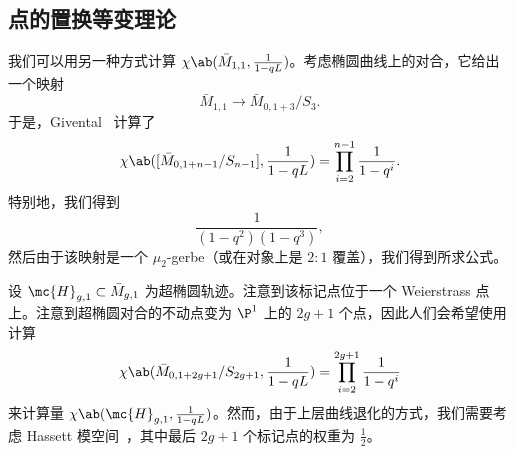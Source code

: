 \subsection{点的置换等变理论}%
\label{sub:Permutation-equivariant theory of a point}

我们可以用另一种方式计算 \(\chi\ab(\bar{M}_{1,1}, \frac{1}{1-q L})\)。考虑椭圆曲线上的对合，它给出一个映射
\[ \bar{M}_{1,1} \to \bar{M}_{0,1+3}/S_3. \]
于是，Givental~\cite{Givental2017K1} 计算了
\[ \chi\ab([\bar{M}_{0,1+n-1}/S_{n-1}], \frac{1}{1-qL}) = \prod_{i=2}^{n-1} \frac{1}{1-q^i}. \]
特别地，我们得到
\[ \frac{1}{(1-q^2)(1-q^3)}, \]
然后由于该映射是一个 \(\mu_2\)-gerbe（或在对象上是 \(2:1\) 覆盖），我们得到所求公式。

设 \(\mc{H}_{g,1} \subset \bar{M}_{g,1}\) 为超椭圆轨迹。注意到该标记点位于一个 Weierstrass 点上。注意到超椭圆对合的不动点变为 \(\P^1\) 上的 \(2g+1\) 个点，因此人们会希望使用计算
\[ \chi\ab(\bar{M}_{0,1+2g+1}/S_{2g+1}, \frac{1}{1-q L}) = \prod_{i=2}^{2g+1} \frac{1}{1-q^i} \]
来计算量
\(\chi\ab(\mc{H}_{g,1}, \frac{1}{1-qL})\)。然而，由于上层曲线退化的方式，我们需要考虑 Hassett 模空间~\cite{Hassett2003}，其中最后 \(2g+1\) 个标记点的权重为 \(\frac{1}{2}\)。
 






